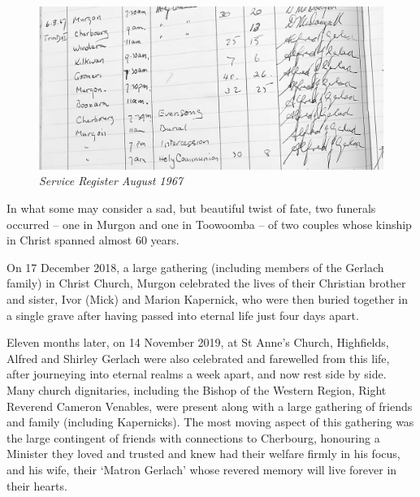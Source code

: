 \begin{figure}[htb]
\begin{center}
\includegraphics[width=1.\textwidth,center]{../images/serviceRegisterAug1967.jpg}
\caption{\itshape Service Register August 1967}
\end{center}
\end{figure}




In what some may consider a sad, but beautiful twist of fate, two funerals occurred -- one in Murgon and one in Toowoomba -- of two couples whose kinship in Christ spanned almost 60 years.



On 17 December 2018, a large gathering (including members of the Gerlach family) in Christ Church, Murgon celebrated the lives of their Christian brother and sister, Ivor (Mick) and Marion Kapernick, who were then buried together in a single grave after having passed into eternal life just four days apart.



Eleven months later, on 14 November 2019, at St Anne's Church, Highfields, Alfred and Shirley Gerlach were also celebrated and farewelled from this life, after journeying into eternal realms a week apart, and now rest side by side. Many church dignitaries, including the Bishop of the Western Region, Right Reverend Cameron Venables, were present along with a large gathering of friends and family (including Kapernicks). The most moving aspect of this gathering was the large contingent of friends with connections to Cherbourg, honouring a Minister they loved and trusted and knew had their welfare firmly in his focus, and his wife, their `Matron Gerlach' whose revered memory will live forever in their hearts.



